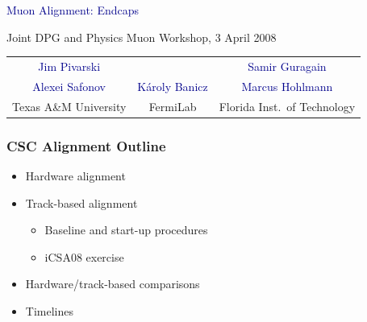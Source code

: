 \documentclass[compress]{beamer}
\begin{document}
\begin{frame}
\begin{center}
\vfill \textcolor{darkblue}{\LARGE Muon Alignment: Endcaps}

\vspace{0.5 cm} \small Joint DPG and Physics Muon Workshop, 3 April 2008

\vfill \begin{tabular}{c c c}
\textcolor{darkblue}{Jim Pivarski} & & \textcolor{darkblue}{Samir Guragain} \\
\textcolor{darkblue}{Alexei Safonov} & \textcolor{darkblue}{K\'aroly Banicz} & \textcolor{darkblue}{Marcus Hohlmann} \\
\small Texas A\&M University & \small FermiLab & \small Florida Inst.\ of Technology
\end{tabular}

\end{center}
\end{frame}


\begin{frame}
\frametitle{CSC Alignment Outline}
\large
\begin{itemize}\setlength{\itemsep}{0.5 cm}
\item Hardware alignment
\item Track-based alignment

\begin{itemize}\setlength{\itemsep}{0.3 cm}
\item \large Baseline and start-up procedures
\item \large iCSA08 exercise
\end{itemize}
\item Hardware/track-based comparisons
\item Timelines
\end{itemize}
\end{frame}
\end{document}
